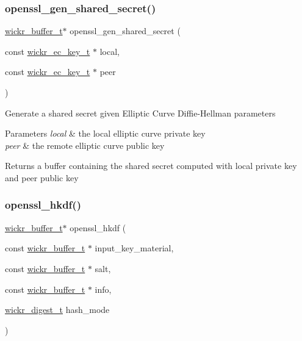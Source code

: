\subsubsection{\texorpdfstring{openssl\+\_\+gen\+\_\+shared\+\_\+secret()}{openssl\_gen\_shared\_secret()}}
{\footnotesize\ttfamily \mbox{\hyperlink{structwickr__buffer}{wickr\+\_\+buffer\+\_\+t}}$\ast$ openssl\+\_\+gen\+\_\+shared\+\_\+secret (\begin{DoxyParamCaption}\item[{const \mbox{\hyperlink{structwickr__ec__key}{wickr\+\_\+ec\+\_\+key\+\_\+t}} $\ast$}]{local,  }\item[{const \mbox{\hyperlink{structwickr__ec__key}{wickr\+\_\+ec\+\_\+key\+\_\+t}} $\ast$}]{peer }\end{DoxyParamCaption})}

Generate a shared secret given Elliptic Curve Diffie-\/\+Hellman parameters


\begin{DoxyParams}{Parameters}
{\em local} & the local elliptic curve private key \\
\hline
{\em peer} & the remote elliptic curve public key \\
\hline
\end{DoxyParams}
\begin{DoxyReturn}{Returns}
a buffer containing the shared secret computed with \textquotesingle{}local\textquotesingle{} private key and \textquotesingle{}peer\textquotesingle{} public key 
\end{DoxyReturn}
\mbox{\label{group__openssl__crypto_ga788a03002d8c6048401cf0bbc2d48c7a}} 
\subsubsection{\texorpdfstring{openssl\+\_\+hkdf()}{openssl\_hkdf()}}
{\footnotesize\ttfamily \mbox{\hyperlink{structwickr__buffer}{wickr\+\_\+buffer\+\_\+t}}$\ast$ openssl\+\_\+hkdf (\begin{DoxyParamCaption}\item[{const \mbox{\hyperlink{structwickr__buffer}{wickr\+\_\+buffer\+\_\+t}} $\ast$}]{input\+\_\+key\+\_\+material,  }\item[{const \mbox{\hyperlink{structwickr__buffer}{wickr\+\_\+buffer\+\_\+t}} $\ast$}]{salt,  }\item[{const \mbox{\hyperlink{structwickr__buffer}{wickr\+\_\+buffer\+\_\+t}} $\ast$}]{info,  }\item[{\mbox{\hyperlink{structwickr__digest}{wickr\+\_\+digest\+\_\+t}}}]{hash\+\_\+mode }\end{DoxyParamCaption})}

